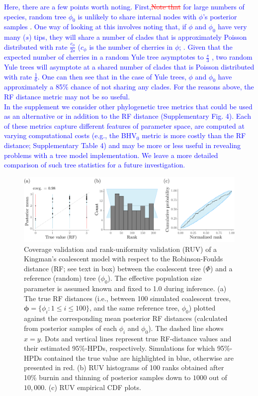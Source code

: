 \documentclass[oneside]{article}
\begin{document}
\textcolor{blue}{Here, there are a few points worth noting. First,}\textcolor{red}{\st{Note that}} \textcolor{blue}{ for large numbers of species, random tree $\phi_0$ is unlikely to share internal nodes with $\phi$'s posterior samples }\citep{steel1988}.
\textcolor{blue}{One way of looking at this involves noting that, if $\phi$ and $\phi_0$ have very many ($s$) tips, they will share a number of clades that is approximately Poisson distributed with rate $\frac{c_{\phi}}{2s}$ ($c_{\phi}$ is the number of cherries in $\phi$; \citealp{bryant09}.
Given that the expected number of cherries in a random Yule tree asymptotes to $\frac{s}{3}$ \citep{mckenzie00}, two random Yule trees will asymptote at a shared number of clades that is Poisson distributed with rate $\frac{1}{6}$.
One can then see that in the case of Yule trees, $\phi$ and $\phi_0$ have approximately a 85$\%$ chance of not sharing any clades.
For the reasons above, the RF distance metric may not be so useful.\\
\indent In the supplement we consider other phylogenetic tree metrics that could be used as an alternative or in addition to the RF distance (Supplementary Fig. 4).
Each of these metrics capture different features of parameter space, are computed at varying computational costs (e.g., the BHV$_0$ metric is more costly than the RF distance; Supplementary Table 4) and may be more or less useful in revealing problems with a tree model implementation.
We leave a more detailed comparison of such tree statistics for a future investigation.} 

\begin{figure}
  \centering
  \includegraphics[width=0.92\linewidth]{../figures/coverage_ruv_coal_RF.pdf}
  \caption{
    Coverage validation and rank-uniformity validation (RUV) of a Kingman's coalescent model with respect to the Robinson-Foulds distance (RF; see text in box) between the coalescent tree ($\Phi$) and a reference (random) tree ($\phi_0$).
    The effective population size parameter is assumed known and fixed to 1.0 during inference.
    (a) The true RF distances (i.e., between 100 simulated coalescent trees, $\boldsymbol{\phi} = \{\phi_i: 1 \leq i \leq 100\}$, and the same reference tree, $\phi_0$) plotted against the corresponding mean posterior RF distances (calculated from posterior samples of each $\phi_i$ and $\phi_0$).
    The dashed line shows $x = y$.
    Dots and vertical lines represent true RF-distance values and their estimated 95\%-HPDs, respectively.
    Simulations for which 95\%-HPDs contained the true value are highlighted in blue, otherwise are presented in red.
    (b) RUV histograms of 100 ranks obtained after 10\% burnin and thinning of posterior samples down to $1000$ out of $10, 000$.
    (c) RUV empirical CDF plots.}
  \label{fig:rf}
\end{figure}
\end{document}
